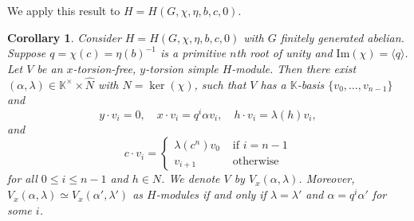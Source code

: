 \documentclass[11pt, twoside]{amsart}
\newtheorem{corollary}[theorem]{Corollary}
\theoremstyle{definition}
\newcommand{\KK}{\mathbb{K}}
\begin{document}
%
We apply this result to $H = H(G, \chi, \eta, b, c, 0)$.
%
\begin{corollary}\label{corollary:x-torsionfree y-torsion simples in zero derivation}
    Consider $H = H(G, \chi, \eta, b, c, 0)$ with $G$ finitely generated abelian. Suppose $q = \chi(c)=\eta(b)^{-1}$ is a primitive $n$th root of unity and $\mathrm{Im}(\chi) = \langle q \rangle$. Let $V$ be an $x$-torsion-free, $y$-torsion simple $H$-module. Then there exist $(\alpha, \lambda) \in \KK^\times \times \widehat{N}$ with $N = \ker(\chi)$, such that $V$ has a $\KK$-basis $\{v_0, \ldots, v_{n-1}\}$ and 
    \[y\cdot v_i = 0,\quad x\cdot v_i = q^i \alpha v_i,\quad h\cdot v_i = \lambda(h)v_i,\]
    and
    \[ c\cdot v_i = \begin{cases}
        \lambda(c^n)v_0 & \text{ if } i = n-1\\ v_{i+1} & \text{ otherwise}
    \end{cases}\]
    for all $0 \leq i \leq n-1$ and $h \in N$. We denote $V$ by $V_{x}(\alpha, \lambda)$. Moreover, $V_{x}(\alpha, \lambda) \simeq V_{x}(\alpha', \lambda')$ as $H$-modules if and only if $\lambda = \lambda'$ and $\alpha = q^i \alpha'$ for some $i$.
\end{corollary}
\end{document}
